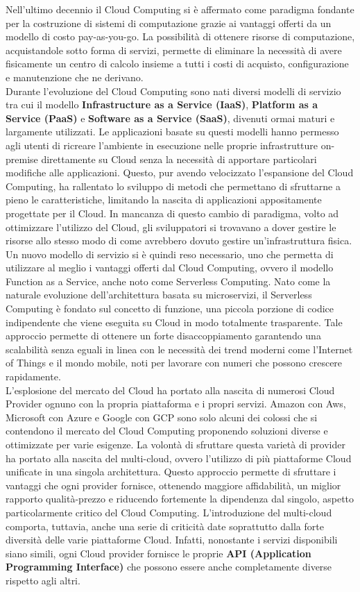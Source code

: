 Nell’ultimo decennio il Cloud Computing si è affermato come paradigma fondante per la costruzione di sistemi di computazione grazie ai vantaggi offerti da un modello di costo pay-as-you-go. La possibilità di ottenere risorse di computazione, acquistandole sotto forma di servizi, permette di eliminare la necessità di avere fisicamente un centro di calcolo insieme a tutti i costi di acquisto, configurazione e manutenzione che ne derivano. \\
Durante l’evoluzione del Cloud Computing sono nati diversi modelli di servizio tra cui il modello \textbf{Infrastructure as a Service (IaaS)}, \textbf{Platform as a Service (PaaS)} e \textbf{Software as a Service (SaaS)}, divenuti ormai maturi e largamente utilizzati. Le applicazioni basate su questi modelli hanno permesso agli utenti di ricreare l’ambiente in esecuzione nelle proprie infrastrutture on-premise direttamente su Cloud senza la necessità di apportare particolari modifiche alle applicazioni. Questo, pur avendo velocizzato l’espansione del Cloud Computing, ha rallentato lo sviluppo di metodi che permettano di sfruttarne a pieno le caratteristiche, limitando la nascita di applicazioni appositamente progettate per il Cloud. In mancanza di questo cambio di paradigma, volto ad ottimizzare l'utilizzo del Cloud, gli sviluppatori si trovavano a dover gestire le risorse allo stesso modo di come avrebbero dovuto gestire un’infrastruttura fisica. Un nuovo modello di servizio si è quindi reso necessario, uno che permetta di utilizzare al meglio i vantaggi offerti dal Cloud Computing, ovvero il modello Function as a Service, anche noto come Serverless Computing. Nato come la naturale evoluzione dell’architettura basata su microservizi, il Serverless Computing è fondato sul concetto di funzione, una piccola porzione di codice indipendente che viene eseguita su Cloud in modo totalmente trasparente. Tale approccio permette di ottenere un forte disaccoppiamento garantendo una scalabilità senza eguali in linea con le necessità dei trend moderni come l’Internet of Things e il mondo mobile, noti per lavorare con numeri che possono crescere rapidamente. \\
L’esplosione del mercato del Cloud ha portato alla nascita di numerosi Cloud Provider ognuno con la propria piattaforma e i propri servizi. Amazon con Aws, Microsoft con Azure e Google con GCP sono solo alcuni dei colossi che si contendono il mercato del Cloud Computing proponendo soluzioni diverse e ottimizzate per varie esigenze. La volontà di sfruttare questa varietà di provider ha portato alla nascita del multi-cloud, ovvero l’utilizzo di più piattaforme Cloud unificate in una singola architettura. Questo approccio permette di sfruttare i vantaggi che ogni provider fornisce, ottenendo maggiore affidabilità, un miglior rapporto qualità-prezzo e riducendo fortemente la dipendenza dal singolo, aspetto particolarmente critico del Cloud Computing. L’introduzione del multi-cloud comporta, tuttavia, anche una serie di criticità date soprattutto dalla forte diversità delle varie piattaforme Cloud. Infatti, nonostante i servizi disponibili siano simili, ogni Cloud provider fornisce le proprie \textbf{API (Application Programming Interface)} che possono essere anche completamente diverse rispetto agli altri. \\
